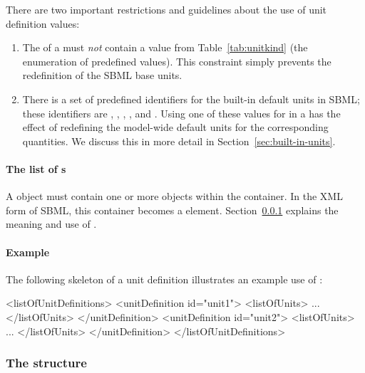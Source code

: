 There are two important restrictions and guidelines about the use
of unit definition  values:
\begin{enumerate}
  
\item The  of a \UnitDefinition must \emph{not} contain
  a value from Table~\ref{tab:unitkind} (\ie the enumeration of
  predefined  values).  This constraint simply
  prevents the redefinition of the SBML base units.

\item There is a set of predefined identifiers for the built-in
  default units in SBML; these identifiers are ,
  , , , and .  Using
  one of these values for  in a \UnitDefinition has the
  effect of redefining the model-wide default units for the
  corresponding quantities.  We discuss this in more detail in
  Section~\ref{sec:built-in-units}.

\end{enumerate}


\paragraph{The list of s}

A \UnitDefinition object must contain one or more \Unit objects
within the  container.  In the XML form of SBML, this
container becomes a  element.
Section~\ref{sec:unit-structure} explains the meaning and use of
\Unit.


\paragraph{Example}

The following skeleton of a unit definition illustrates an example
use of \UnitDefinition:

\begin{example}
<listOfUnitDefinitions>
    <unitDefinition id="unit1">
        <listOfUnits>
            ...
        </listOfUnits>
    </unitDefinition>
    <unitDefinition id="unit2">
        <listOfUnits>
            ...
        </listOfUnits>
    </unitDefinition>
</listOfUnitDefinitions>
\end{example}


\subsubsection{The  structure}
\label{sec:unit-structure}

